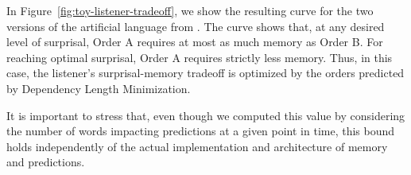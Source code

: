 \documentclass[11pt,letterpaper]{article}
\begin{document}


In Figure~\ref{fig:toy-listener-tradeoff}, we show the resulting curve for the two versions of the artificial language from \cite{fedzechkina-human-2017}.
The curve shows that, at any desired level of surprisal, Order A requires at most as much memory as Order B.
For reaching optimal surprisal, Order A requires strictly less memory.
Thus, in this case, the listener's surprisal-memory tradeoff is optimized by the orders predicted by Dependency Length Minimization.

It is important to stress that, even though we computed this value by considering the number of words impacting predictions at a given point in time, this bound holds independently of the actual implementation and architecture of memory and predictions.
\end{document}
